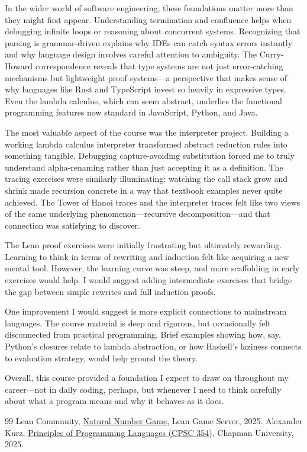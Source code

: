\documentclass{article}
\theoremstyle{theorem}
\theoremstyle{definition}
\theoremstyle{remark}
\begin{document}
In the wider world of software engineering, these foundations matter more than they might first appear. Understanding termination and confluence helps when debugging infinite loops or reasoning about concurrent systems. Recognizing that parsing is grammar-driven explains why IDEs can catch syntax errors instantly and why language design involves careful attention to ambiguity. The Curry-Howard correspondence reveals that type systems are not just error-catching mechanisms but lightweight proof systems---a perspective that makes sense of why languages like Rust and TypeScript invest so heavily in expressive types. Even the lambda calculus, which can seem abstract, underlies the functional programming features now standard in JavaScript, Python, and Java.

The most valuable aspect of the course was the interpreter project. Building a working lambda calculus interpreter transformed abstract reduction rules into something tangible. Debugging capture-avoiding substitution forced me to truly understand alpha-renaming rather than just accepting it as a definition. The tracing exercises were similarly illuminating: watching the call stack grow and shrink made recursion concrete in a way that textbook examples never quite achieved. The Tower of Hanoi traces and the interpreter traces felt like two views of the same underlying phenomenon---recursive decomposition---and that connection was satisfying to discover.

The Lean proof exercises were initially frustrating but ultimately rewarding. Learning to think in terms of rewriting and induction felt like acquiring a new mental tool. However, the learning curve was steep, and more scaffolding in early exercises would help. I would suggest adding intermediate exercises that bridge the gap between simple rewrites and full induction proofs.

One improvement I would suggest is more explicit connections to mainstream languages. The course material is deep and rigorous, but occasionally felt disconnected from practical programming. Brief examples showing how, say, Python's closures relate to lambda abstraction, or how Haskell's laziness connects to evaluation strategy, would help ground the theory.

Overall, this course provided a foundation I expect to draw on throughout my career---not in daily coding, perhaps, but whenever I need to think carefully about what a program means and why it behaves as it does.

\begin{thebibliography}{99}
 Lean Community, \href{https://adam.math.hhu.de/#/g/leanprover-community/nng4}{Natural Number Game}, Lean Game Server, 2025.
 Alexander Kurz, \href{https://codeberg.org/alexhkurz/programming-languages-2025/src/branch/main}{Principles of Programming Languages (CPSC 354)}, Chapman University, 2025.
\end{thebibliography}
\end{document}
